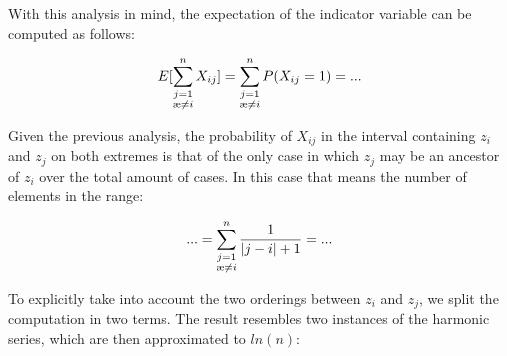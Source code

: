 \documentclass[a4paper]{article}
\begin{document}
With this analysis in mind, the expectation of the indicator variable can
be computed as follows:

\[E[\sum\limits_{\substack{j = 1\\\j \ne i}}^{n} X_{ij}] = \sum\limits_{\substack{j = 1\\\j \ne i}}^{n} P(X_{ij} = 1) = ...\]

Given the previous analysis, the probability of \(X_{ij}\) in the
interval containing \(z_i\) and \(z_j\) on both extremes is that of the
only case in which \(z_j\) may be an ancestor of \(z_i\) over the total
amount of cases. In this case that means the number of elements in the
range:

\[... = \sum\limits_{\substack{j = 1\\\j \ne i}}^{n} \frac{1}{|j - i| + 1} = ...\]

To explicitly take into account the two orderings between \(z_i\) and
\(z_j\), we split the computation in two terms. The result resembles two
instances of the harmonic series, which are then approximated to
\(ln(n)\):
\end{document}

